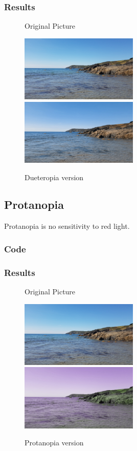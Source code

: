 \documentclass{Report}
\begin{document}
\subsubsection{Results}
\begin{figure}[h!]
  \centering
  \caption{Original Picture}
  \includegraphics[width=0.5\textwidth]{Lizard}
  \centering
  \includegraphics[width=0.5\textwidth]{./ColourBlindness/Dichromat/Deuteropia.jpg}
  \caption{Dueteropia version}
\end{figure}

\newpage

\subsection{Protanopia}

Protanopia is no sensitivity to red light. \autocites{Types}
\subsubsection{Code}


\newpage

\subsubsection{Results}
\begin{figure}[h!]
  \centering
  \caption{Original Picture}
  \includegraphics[width=0.5\textwidth]{Lizard}
  \centering
  \includegraphics[width=0.5\textwidth]{./ColourBlindness/Dichromat/Protanopia.jpg}
  \caption{Protanopia version}
\end{figure}
\end{document}
